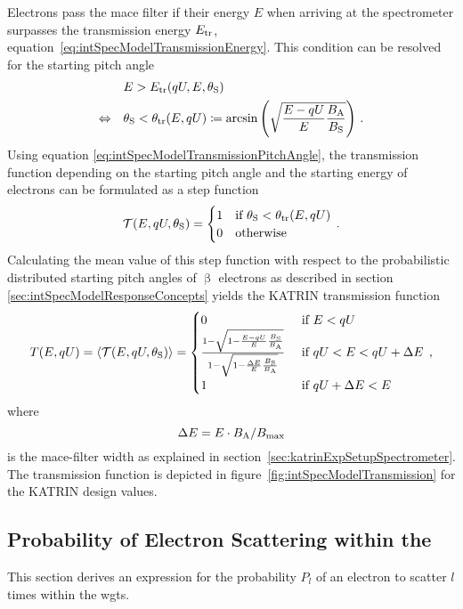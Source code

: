 Electrons pass the \gls{mace} filter if their energy $E$ when arriving at the spectrometer surpasses the transmission energy $E_\mathrm{tr}$, equation~\eqref{eq:intSpecModelTransmissionEnergy}. This condition can be resolved for the starting pitch angle~\cite{Groh2015}
\begin{align}
&E > E_\mathrm{tr}(qU,E,\theta_\mathrm{S}) \nonumber \\
\Leftrightarrow \quad
& \theta_\mathrm{S} < \theta_\mathrm{tr}(E,qU)
\coloneqq
\arcsin
\left(\sqrt{
	\frac{E-qU}{E} 
	\frac{B_\mathrm{A}}{B_\mathrm{S}}
}\right)
\text{\,.}
\label{eq:intSpecModelTransmissionPitchAngle}
\end{align}
Using equation \eqref{eq:intSpecModelTransmissionPitchAngle}, the transmission function depending on the starting pitch angle and the starting energy of electrons can be formulated as a step function
\begin{equation}
\label{eq:intSpecModelTransmissionStep}
\mathcal{T}(E, qU, \theta_\mathrm{S}) =
\begin{cases}
1 & \text{if } \theta_\mathrm{S} < \theta_\mathrm{tr}(E,qU) \\
0 & \text{otherwise} 
\end{cases}
\text{\,.}
\end{equation}
Calculating the mean value of this step function with respect to the probabilistic distributed starting pitch angles of $\upbeta$ electrons as described in section~ \ref{sec:intSpecModelResponseConcepts} yields the KATRIN transmission function~\cite{Angrik:2005ep}
\begin{equation}
\label{eq:intSpecModelTransmission}
	T(E, qU) = 
	\left\langle{\mathcal{T}(E, qU, \theta_\mathrm{S})}\right\rangle =
	\begin{cases}
	0 & \text{ if } E < qU \\
	\frac{
		1-\sqrt{
			1-\frac{E-qU}{E} 
			\frac{B_\mathrm{S}}{B_\mathrm{A}}
		} 
	}{
		1-\sqrt{1-\frac{\Delta E}{E}\frac{B_\mathrm{S}}{B_\mathrm{A}}}
	}
	& \text{ if } qU < E < qU + \Delta E \\
	1 & \text{ if } qU + \Delta E < E
	\end{cases}
	\text{\,,}
\end{equation}
where 
\begin{equation}
	\label{eq:intSpecModelTransmissionMACEFilterWidth}
	\Delta E=E\cdot B_\mathrm{A}/B_\mathrm{max}
\end{equation}
is the \gls{mace}-filter width as explained in section~\ref{sec:katrinExpSetupSpectrometer}. The transmission function is depicted in figure~\ref{fig:intSpecModelTransmission} for the KATRIN design values.

\subsection{Probability of Electron Scattering within the }
\label{sec:intSpecModelResponseScattering}
This section derives an expression for the probability $P_l$ of an electron to scatter $l$ times within the \gls{wgts}.

